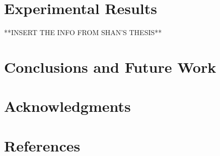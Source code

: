 \documentclass[11pt,psfig]{article}
\begin{document}
\section*{Experimental Results}

**INSERT THE INFO FROM SHAN'S THESIS**

\section*{Conclusions and Future Work}

\section*{Acknowledgments}

\section*{References}    

\end{document}
